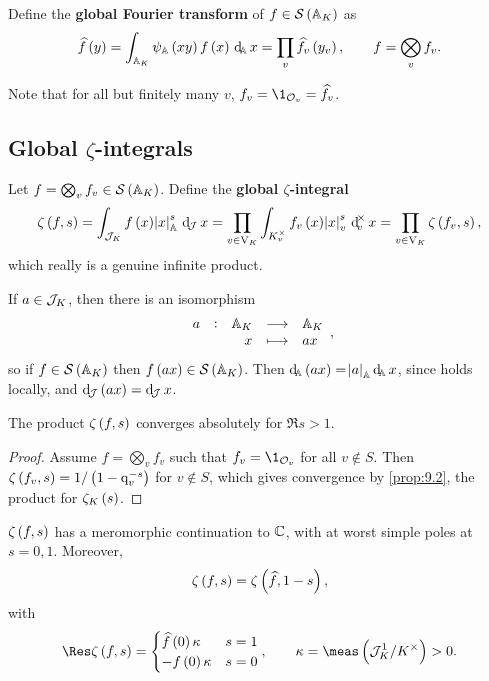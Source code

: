 \begin{definition*}
Define the \textbf{global Fourier transform} of $ f \in \SSS\br{\AA_K} $ as
$$ \widehat{f}\br{y} = \intA{\psi_\AA\br{xy}f\br{x}}{x} = \prod_v \widehat{f_v}\br{y_v}, \qquad f = \bigotimes_v f_v. $$
\end{definition*}

Note that for all but finitely many $ v $, $ f_v = \1_{\OOO_v} = \widehat{f_v} $.

\pagebreak

\subsection{Global \texorpdfstring{$ \zeta $}{zeta}-integrals}

\begin{definition*}
Let $ f = \bigotimes_v f_v \in \SSS\br{\AA_K} $. Define the \textbf{global $ \zeta $-integral}
$$ \zeta\br{f, s} = \intJ{f\br{x}\abs{x}_\AA^s}{x} = \prod_{v \in \V_K} \intvX{f_v\br{x}\abs{x}_v^s}{x} = \prod_{v \in \V_K} \zeta\br{f_v, s}, $$
which really is a genuine infinite product.
\end{definition*}


If $ a \in \mathcal{J}_K $, then there is an isomorphism
$$ \function[a]{\AA_K}{\AA_K}{x}{ax}, $$
so if $ f \in \SSS\br{\AA_K} $ then $ f\br{ax} \in \SSS\br{\AA_K} $. Then $ \dA\br{ax} = \abs{a}_\AA\dA x $, since holds locally, and $ \dJ\br{ax} = \dJ x $.

\begin{proposition}
The product $ \zeta\br{f, s} $ converges absolutely for $ \Re s > 1 $.
\end{proposition}

\begin{proof}
Assume $ f = \bigotimes_v f_v $ such that $ f_v = \1_{\OOO_v} $ for all $ v \notin S $. Then $ \zeta\br{f_v, s} = 1 / \br{1 - \q_v^{-s}} $ for $ v \notin S $, which gives convergence by \ref{prop:9.2}, the product for $ \zeta_K\br{s} $.
\end{proof}

\begin{theorem}
\label{thm:9.11}
$ \zeta\br{f, s} $ has a meromorphic continuation to $ \mathbb{C} $, with at worst simple poles at $ s = 0, 1 $. Moreover,
$$ \zeta\br{f, s} = \zeta\br{\widehat{f}, 1 - s}, $$
with
$$ \Res \zeta\br{f, s} =
\begin{cases}
\widehat{f}\br{0}\kappa & s = 1 \\
-f\br{0}\kappa & s = 0
\end{cases},
\qquad \kappa = \meas\br{\JJJ_K^1 / K^\times} > 0. $$
\end{theorem}

